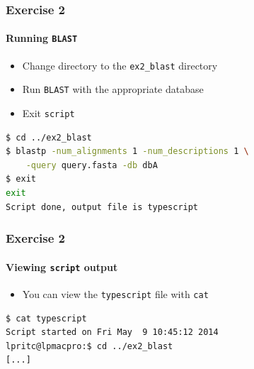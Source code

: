 \documentclass[table]{beamer}
\begin{document}
  \begin{frame}[fragile]
    \frametitle{Exercise 2}
    \framesubtitle{Running \texttt{BLAST}}
    \begin{itemize}
      \item Change directory to the \texttt{ex2\_blast} directory
      \item Run \texttt{BLAST} with the appropriate database
      \item Exit \texttt{script}
    \end{itemize}
    \begin{lstlisting}[language=bash]
$ cd ../ex2_blast
$ blastp -num_alignments 1 -num_descriptions 1 \
    -query query.fasta -db dbA
$ exit
exit
Script done, output file is typescript
    \end{lstlisting}    
\end{frame}

  \begin{frame}[fragile]
    \frametitle{Exercise 2}
    \framesubtitle{Viewing \texttt{script} output}
    \begin{itemize}
      \item You can view the \texttt{typescript} file with \texttt{cat}
    \end{itemize}
    \begin{lstlisting}[language=bash]
$ cat typescript
Script started on Fri May  9 10:45:12 2014
lpritc@lpmacpro:$ cd ../ex2_blast
[...]
    \end{lstlisting}    
\end{frame}
\end{document}
